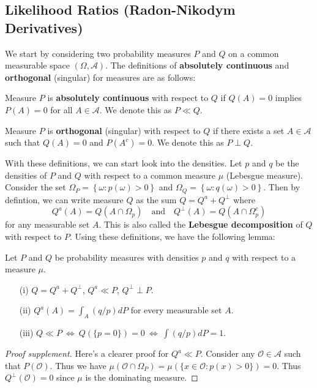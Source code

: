 \documentclass{article}
\begin{document}
\subsection{Likelihood Ratios (Radon-Nikodym Derivatives)}
We start by considering two probability measures $P$ and $Q$ on a common measurable space $(\Omega, \mathcal{A})$. The definitions of \textbf{absolutely continuous} and \textbf{orthogonal} (singular) for measures are as follows:
\begin{definition}
    Measure $P$ is \textbf{absolutely continuous} with respect to $Q$ if $Q(A) = 0$ implies $P(A) = 0$ for all $A \in \mathcal{A}$. We denote this as $P \ll Q$.
\end{definition}
\begin{definition}
    Measure $P$ is \textbf{orthogonal} (singular) with respect to $Q$ if there exists a set $A \in \mathcal{A}$ such that $Q(A) = 0$ and $P(A^c) = 0$. We denote this as $P \perp Q$.
\end{definition}
With these definitions, we can start look into the densities. Let $p$ and $q$ be the densities of $P$ and $Q$ with respect to a common measure $\mu$ (Lebesgue measure). Consider the set $\Omega_P = \left\{ \omega : p(\omega) > 0 \right\}$ and $\Omega_Q = \left\{ \omega : q(\omega) > 0 \right\}$. Then by defintion, we can write measure $Q$ as the sum $Q = Q^a + Q^\perp$ where
\begin{equation}
    Q^a(A) = Q(A\cap \Omega_p) \quad \text{and} \quad Q^\perp(A) = Q(A\cap \Omega_p^c)
\end{equation}
for any measurable set $A$. This is also called the \textbf{Lebesgue decomposition} of $Q$ with respect to $P$. Using these definitions, we have the following lemma:
\begin{lemma}\label{lemma:contiguity}
    Let \(P\) and \(Q\) be probability measures with densities \(p\) and \(q\) with respect to a measure \(\mu\).
    \begin{enumerate}
        \item[(i)] \(Q = Q^a + Q^\perp\), \(Q^a \ll P\), \(Q^\perp \perp P\).
        \item[(ii)] \(Q^a(A) = \int_A \left(q/p\right) dP\) for every measurable set \(A\).
        \item[(iii)] \(Q \ll P \:\Longleftrightarrow\: Q(\{p = 0\}) = 0 \:\Longleftrightarrow\: \int \left(q/p\right) dP = 1\).
    \end{enumerate}
\end{lemma}
\begin{proof}[Proof supplement]
    Here's a clearer proof for $Q^a \ll P$. Consider any $\mathcal{O} \in \mathcal{A}$ such that $P(\mathcal{O})$. Thus we have $\mu(\mathcal{O}\cap\Omega_P) = \mu(\{x \in \mathcal{O}: p(x) > 0\}) = 0$. Thus $Q^\perp(\mathcal{O}) = 0$ since $\mu$ is the dominating measure.
\end{proof}
\end{document}

